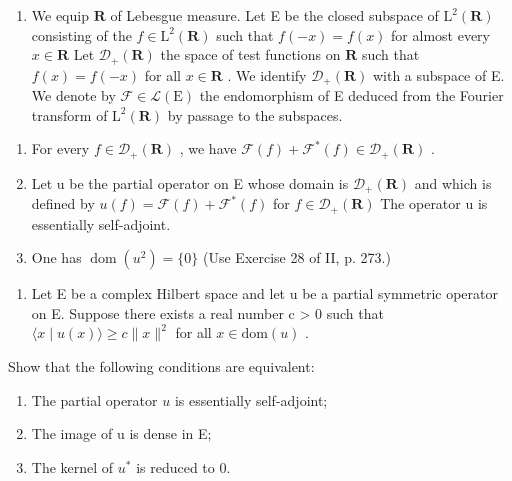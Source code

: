 \begin{enumerate}
\def\labelenumi{\arabic{enumi})}
\setcounter{enumi}{11}
\tightlist
\item
  We equip \(\mathbf{R}\) of Lebesgue measure. Let E be the closed subspace of \(\mathrm{L}^2 (\mathbf{R})\) consisting of the \(f\in \mathrm{L}^2 (\mathbf{R})\) such that \(f(-x) = f(x)\) for almost every \(x\in \mathbf{R}\) Let \(\mathcal{D}_{+}(\mathbf{R})\) the space of test functions on \(\mathbf{R}\) such that \(f(x) = f(-x)\) for all \(x\in \mathbf{R}\) . We identify \(\mathcal{D}_{+}(\mathbf{R})\) with a subspace of E. We denote by \(\mathcal{F}\in \mathcal{L}(\mathrm{E})\) the endomorphism of E deduced from the Fourier transform of \(\mathrm{L}^2 (\mathbf{R})\) by passage to the subspaces.
\end{enumerate}

\begin{enumerate}
\def\labelenumi{\alph{enumi})}
\item
  For every \(f \in \mathcal{D}_{+}(\mathbf{R})\) , we have \(\mathcal{F}(f) + \mathcal{F}^{*}(f) \in \mathcal{D}_{+}(\mathbf{R})\) .
\item
  Let u be the partial operator on E whose domain is \(\mathcal{D}_{+}(\mathbf{R})\) and which is defined by \(u(f) = \mathcal{F}(f) + \mathcal{F}^{*}(f)\) for \(f \in \mathcal{D}_{+}(\mathbf{R})\) The operator u is essentially self-adjoint.
\item
  One has \(\operatorname{dom}(u^{2})=\{0\}\) (Use Exercise 28 of II, p. 273.)
\end{enumerate}

\begin{enumerate}
\def\labelenumi{\arabic{enumi})}
\setcounter{enumi}{12}
\tightlist
\item
  Let E be a complex Hilbert space and let u be a partial symmetric operator on E. Suppose there exists a real number c \textgreater{} 0 such that \(\langle x \mid u(x) \rangle \geqslant c \|x\|^{2}\) for all \(x \in \text{dom}(u)\) .
\end{enumerate}

Show that the following conditions are equivalent:

\begin{enumerate}
\def\labelenumi{(\roman{enumi})}
\item
  The partial operator \(u\) is essentially self-adjoint;
\item
  The image of u is dense in E;
\item
  The kernel of \(u^{*}\) is reduced to 0.
\end{enumerate}

